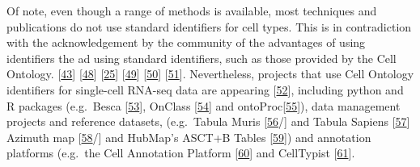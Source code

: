 Of note, even though a range of methods is available, most techniques and publications do not use standard identifiers for cell types.
This is in contradiction with the acknowledgement by the community of the advantages of using identifiers the ad using standard identifiers, such as those provided by the Cell Ontology. {[}\protect\hyperlink{ref-ii1dVqoy}{43}{]} {[}\protect\hyperlink{ref-tvnuubVW}{48}{]} {[}\protect\hyperlink{ref-J5X2Xu6M}{25}{]} {[}\protect\hyperlink{ref-agnqfdk6}{49}{]} {[}\protect\hyperlink{ref-SozKx0lF}{50}{]} {[}\protect\hyperlink{ref-15xnotFsw}{51}{]}.
Nevertheless, projects that use Cell Ontology identifiers for single-cell RNA-seq data are appearing {[}\protect\hyperlink{ref-qT8WxqjA}{52}{]}, including python and R packages (e.g.~Besca {[}\protect\hyperlink{ref-P1gDLuog}{53}{]}, OnClass {[}\protect\hyperlink{ref-sW6aNZJB}{54}{]} and ontoProc{[}\protect\hyperlink{ref-15YmDXALp}{55}{]}), data management projects and reference datasets, (e.g.~Tabula Muris {[}\protect\hyperlink{ref-tdlWsvTd}{56}/{]} and Tabula Sapiens {[}\protect\hyperlink{ref-FjUqVIOp}{57}{]} Azimuth map {[}\protect\hyperlink{ref-T7RxnUNw}{58}/{]} and HubMap's ASCT+B Tables {[}\protect\hyperlink{ref-1FghWzORJ}{59}{]}) and annotation platforms (e.g.~the Cell Annotation Platform {[}\protect\hyperlink{ref-yMavNVkS}{60}{]} and CellTypist {[}\protect\hyperlink{ref-123DiCgc8}{61}{]}.

